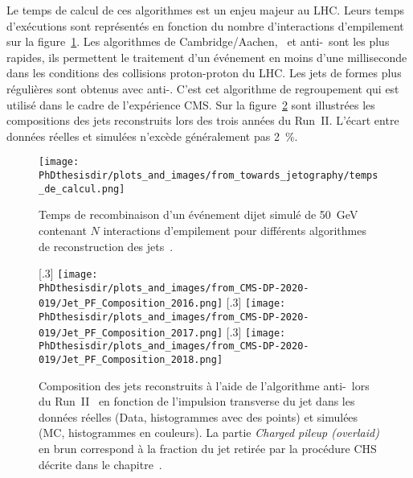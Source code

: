 \par Le temps de calcul de ces algorithmes est un enjeu majeur au LHC.
Leurs temps d'exécutions sont représentés en fonction du nombre d'interactions d'empilement sur la figure~\ref{fig-chapter-CMS-section-jets_reco-subsec-algo-perfs}.
Les algorithmes de Cambridge/Aachen, \kT\ et anti-\kT\ sont les plus rapides, ils permettent le traitement d'un événement en moins d'une milliseconde dans les conditions des collisions proton-proton du LHC.
Les jets de formes plus régulières sont obtenus avec anti-\kT.
C'est cet algorithme de regroupement qui est utilisé dans le cadre de l'expérience CMS.
Sur la figure~\ref{fig-Jet_PF_Composition_RunII} sont illustrées les compositions des jets reconstruits lors des trois années du Run~II. L'écart entre données réelles et simulées n'excède généralement pas \SI{2}{\%}.
\begin{figure}[h]
\centering
\texttt{[image: \\PhDthesisdir/plots\_and\_images/from\_towards\_jetography/temps\_de\_calcul.png]}
\caption[Temps de recombinaison d'un événement dijet.]{Temps de recombinaison d'un événement dijet simulé de \SI{50}{\GeV} contenant $N$ interactions d'empilement pour différents algorithmes de reconstruction des jets~\cite{towards_jetography}.}
\label{fig-chapter-CMS-section-jets_reco-subsec-algo-perfs}
\end{figure}
\begin{figure}[h]
\centering
{}[.3\textwidth]
{\texttt{[image: \\PhDthesisdir/plots\_and\_images/from\_CMS-DP-2020-019/Jet\_PF\_Composition\_2016.png]}}
\hfill
{}[.3\textwidth]
{\texttt{[image: \\PhDthesisdir/plots\_and\_images/from\_CMS-DP-2020-019/Jet\_PF\_Composition\_2017.png]}}
\hfill
{}[.3\textwidth]
{\texttt{[image: \\PhDthesisdir/plots\_and\_images/from\_CMS-DP-2020-019/Jet\_PF\_Composition\_2018.png]}}
\caption[Compositions des jets reconstruits lors du Run~II.]{Composition des jets reconstruits à l'aide de l'algorithme anti-\kT\ lors du Run~II~\cite{CMS-DP-2020-019} en fonction de l'impulsion transverse du jet dans les données réelles (Data, histogrammes avec des points) et simulées (MC, histogrammes en couleurs). La partie \emph{Charged pileup (overlaid)} en brun correspond à la fraction du jet retirée par la procédure CHS décrite dans le chapitre~.}
\label{fig-Jet_PF_Composition_RunII}
\end{figure}
